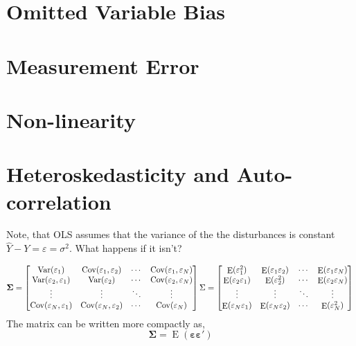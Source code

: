 \documentclass[]{book}
\DeclareMathOperator{\E}{E}
\DeclareMathOperator{\Var}{Var}
\DeclareMathOperator{\Cov}{Cov}
\newcommand{\mat}[1]{\boldsymbol{#1}}
\renewcommand{\vec}[1]{\boldsymbol{#1}}
\renewcommand{\T}{'}
\begin{document}
\section{Omitted Variable Bias}\label{omitted-variable-bias}

\section{Measurement Error}\label{measurement-error}

\section{Non-linearity}\label{non-linearity}

\section{Heteroskedasticity and
Auto-correlation}\label{heteroskedasticity-and-auto-correlation}

Note, that OLS assumes that the variance of the the disturbances is
constant \(\hat{Y} - Y = \varepsilon = \sigma^2\). What happens if it
isn't?

\[
\mat{\Sigma} =
\begin{bmatrix}
\Var(\varepsilon_1) & \Cov(\varepsilon_1, \varepsilon_2) & \cdots & \Cov(\varepsilon_1, \varepsilon_N) \\
\Var(\varepsilon_2, \varepsilon_1) & \Var(\varepsilon_2) & \cdots & \Cov(\varepsilon_2, \varepsilon_N) \\
\vdots & \vdots & \ddots & \vdots \\
\Cov(\varepsilon_N, \varepsilon_1) & \Cov(\varepsilon_N, \varepsilon_2) & \cdots & \Cov(\varepsilon_N) \\
\end{bmatrix} \\
\Sigma =
\begin{bmatrix}
\E(\varepsilon_1^2) & \E(\varepsilon_1 \varepsilon_2) & \cdots & \E(\varepsilon_1 \varepsilon_N) \\
\E(\varepsilon_2 \varepsilon_1) & \E(\varepsilon_2^2) & \cdots & \E(\varepsilon_2 \varepsilon_N) \\
\vdots & \vdots & \ddots & \vdots \\
\E(\varepsilon_N \varepsilon_1) & \E(\varepsilon_N \varepsilon_2) & \cdots & \E(\varepsilon_N^2) \\
\end{bmatrix} \\
\] The matrix can be written more compactly as, \[
\mat{\Sigma} = \E(\vec{\varepsilon} \vec{\varepsilon}\T)
\]
\end{document}
